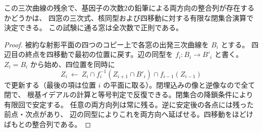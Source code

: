 \begin{proposition}\label{prop:decide-compatible-secants}
この三次曲線の残余で、基因子の次数2の鉛筆による両方向の整合列が存在するかどうかは、
四窓の三次式、核同型および四移動に対する有限な閉集合演算で決定できる。
この試験に通る窓は全次数で正則である。
\end{proposition}
\begin{proof}
被約な射影平面の四つのコピー上で各窓の出発三次曲線を $B_i$ とする。
四辺目の終点を四移動で最初の位置に戻す。辺の同型を $f_i:B_i\to B'_i$ と書く。
$Z_i=B_i$ から始め、四位置を同時に
\[
 Z_i\ \longleftarrow\ Z_i\cap f_i^{-1}(Z_{i+1}\cap B'_i)
                       \cap f_{i-1}(Z_{i-1})
\]
で更新する（最後の項は位置 $i$ の平面に取る）。閉埋込みの像と逆像なので全て閉で、
根基イデアルの計算と等号判定で反復できる。閉集合の降鎖条件により有限回で安定する。
任意の両方向列は常に残る。逆に安定後の各点には残った前点・次点があり、
辺の同型によりこれを両方向へ延ばせる。四移動をほどけばもとの整合列である。
\end{proof}
